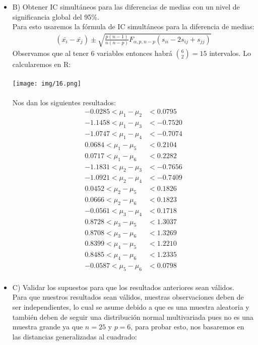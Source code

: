 \begin{sol}
\begin{itemize}
\item B) Obtener IC simultáneos para las diferencias de medias con un nivel de significancia global del 95\%.\\
Para esto usaremos la fórmula de IC simultáneos para la diferencia de medias:
\begin{align*}
(\bar{x_i}-\bar{x_j}) \pm \sqrt{\frac{p(n-1)}{n(n-p)}F_{\alpha,p,n-p}(s_{ii}-2s_{ij}+s_{jj})}
\end{align*}
Observamos que al tener 6 variables entonces habrá $\binom{6}{2} = 15$ intervalos. Lo calcularemos en R:\\\\
\texttt{[image: img/16.png]}\\\\
Nos dan los siguientes resultados:
\begin{align*}
-0.0285 < \mu_1 - \mu_2 &< 0.0795 \\
-1.1458 < \mu_1 - \mu_3 &< -0.7520 \\
-1.0747 < \mu_1 - \mu_4 &< -0.7074 \\
 0.0684 < \mu_1 - \mu_5 &< 0.2104 \\
 0.0717 < \mu_1 - \mu_6 &< 0.2282 \\
-1.1831 < \mu_2 - \mu_3 &< -0.7656 \\
-1.0921 < \mu_2 - \mu_4 &< -0.7409 \\
 0.0452 < \mu_2 - \mu_5 &< 0.1826 \\
 0.0666 < \mu_2 - \mu_6 &< 0.1823 \\
-0.0561 < \mu_3 - \mu_4 &< 0.1718 \\
 0.8728 < \mu_3 - \mu_5 &< 1.3037 \\
 0.8708 < \mu_3 - \mu_6 &< 1.3269 \\
 0.8399 < \mu_4 - \mu_5 &< 1.2210 \\
 0.8485 < \mu_4 - \mu_6 &< 1.2335 \\
-0.0587 < \mu_5 - \mu_6 &< 0.0798 \\
\end{align*} \pagebreak
\item C) Validar los supuestos para que los resultados anteriores sean válidos. \\
Para que nuestros resultados sean válidos, nuestras observaciones deben de ser independientes, lo cual se asume debido a que es una muestra aleatoria y también deben de seguir una distribución normal multivariada pues no es una muestra grande ya que $n=25$ y $p=6$, para probar esto, nos basaremos en las distancias generalizadas al cuadrado:

\end{itemize}
\end{sol}
